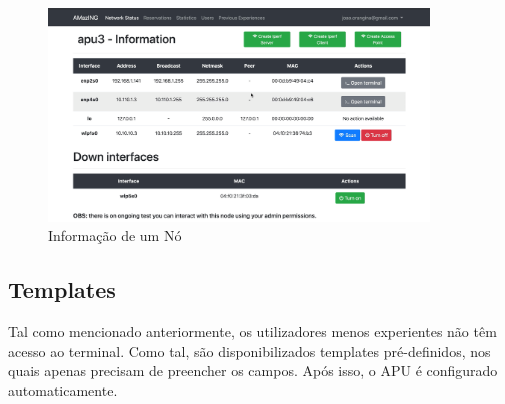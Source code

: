 \begin{figure}[!ht]
    \centering
    \includegraphics[width=0.9\textwidth]{images/node_stats.png}
    \caption{Informação de um Nó}
    \label{fig:nodeinfo}
\end{figure}

\subsection{Templates}
Tal como mencionado anteriormente, os utilizadores menos experientes não têm acesso ao terminal. Como tal, são disponibilizados templates pré-definidos, nos quais apenas precisam de preencher os campos. Após isso, o APU é configurado automaticamente.

